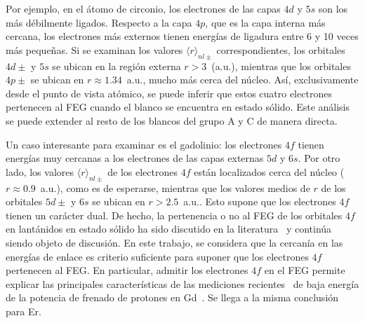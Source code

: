 Por ejemplo, en el átomo de circonio, los electrones de las capas $4d$ y
$5s$ son los más débilmente ligados. Respecto a la capa $4p$, que es la 
capa interna más cercana, los electrones más externos tienen energías de 
ligadura entre 6 y 10 veces más pequeñas. Si se examinan los valores 
$\langle r \rangle_{nl\pm}$ correspondientes, los orbitales $4d\pm$ y 
$5s$ se ubican en la región externa $r>3$~(a.u.), mientras que los 
orbitales $4p\pm$ se ubican en $r\approx 1.34$~a.u., mucho más cerca del 
núcleo. Así, exclusivamente desde el punto de vista atómico, se puede 
inferir que estos cuatro electrones pertenecen al FEG cuando el blanco 
se encuentra en estado sólido. Este análisis se puede extender al resto 
de los blancos del grupo A y C de manera directa. 

Un caso interesante para examinar es el gadolinio: los electrones $4f$ 
tienen energías muy cercanas a los electrones de las capas externas $5d$ 
y $6s$. Por otro lado, los valores $\langle r\rangle_{nl\pm}$ de los 
electrones $4f$ están localizados cerca del núcleo ($r\approx 0.9$~a.u.), 
como es de esperarse, mientras que los valores medios de $r$ de los 
orbitales $5d\pm$ y $6s$ se ubican en $r>2.5$~a.u.. Esto supone que los 
electrones $4f$ tienen un carácter dual. De hecho, la pertenencia o no 
al FEG de los orbitales $4f$ en lantánidos en estado sólido ha sido 
discutido en la literatura~\cite{Strange:99,Bonnelle:15} y continúa 
siendo objeto de discusión. En este trabajo, se considera que la 
cercanía en las energías de enlace es criterio suficiente para suponer 
que los electrones $4f$ pertenecen al FEG. En particular, admitir los 
electrones $4f$ en el FEG permite explicar las principales 
características de las mediciones recientes~\cite{Montanari:17} de baja 
energía de la potencia de frenado de protones en Gd~\cite{Roth:17}.
Se llega a la misma conclusión para Er. 

\begin{comment}
Bonelle & Spector: 
The discrete or extended character of 4f levels in the rare-earth metals 
and compounds remained, therefore, an open problem and the question was 
to know whether to treat the 4f levels in a core-like model or in a 
strongly correlated band model. 
\end{comment}


